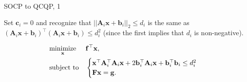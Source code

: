 \documentclass{beamer}
\begin{document}
\begin{frame}{SOCP to QCQP, 1}
\begin{flushleft}

Set $\mathbf{c}_i = 0$ and recognize that $||\mathbf{A}_i\mathbf{x} + \mathbf{b}_i||_2 \leq d_i$ is the same as $(\mathbf{A}_i\mathbf{x} + \mathbf{b}_i)^\top (\mathbf{A}_i\mathbf{x} + \mathbf{b}_i) \leq d_i^2$ (since the first implies that $d_i$ is non-negative).

\bigskip
%
\begin{equation}
\begin{aligned}
& \underset{\mathbf{x}}{\text{minimize}}
& & \mathbf{f}^\top\mathbf{x}, \\
& \text{subject to}
& & \begin{cases}
    \mathbf{x}^\top \mathbf{A}_i^\top \mathbf{A}_i \mathbf{x} + 
    2 \mathbf{b}_i^\top \mathbf{A}_i\mathbf{x} + 
    \mathbf{b}_i^\top \mathbf{b}_i  \leq d_i^2\\
    \mathbf{F}\mathbf{x} = \mathbf{g}.
    \end{cases}
\end{aligned}
\end{equation}

\end{flushleft}
\end{frame}
\end{document}
